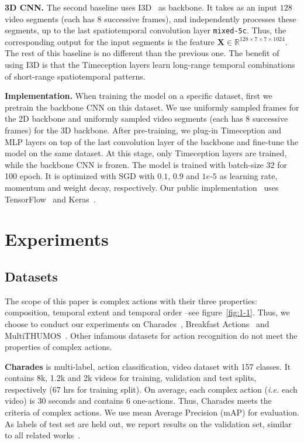 \documentclass[10pt,twocolumn,letterpaper]{article}
\newcommand{\partitle}[1]{\noindent\textbf{#1}}
\begin{document}
\partitle{3D CNN.}
The second baseline uses I3D~\cite{carreira2017quo} as backbone.
It takes as an input $128$ video segments (each has 8 successive frames), and independently processes these segments, up to the last spatiotemporal convolution layer \texttt{mixed-5c}.
Thus, the corresponding output for the input segments is the feature $\mathbf{X} \in \mathbb{R}^{128 \times 7 \times 7 \times 1024}$.
The rest of this baseline is no different than the previous one.
The benefit of using I3D is that the Timeception layers learn long-range temporal combinations of short-range spatiotemporal patterns.

\partitle{Implementation.}
When training the model on a specific dataset, first we pretrain the backbone CNN on this dataset.
We use uniformly sampled frames for the 2D backbone and uniformly sampled video segments (each has 8 successive frames) for the 3D backbone.
After pre-training, we plug-in Timeception and MLP layers on top of the last convolution layer of the backbone and fine-tune the model on the same dataset.
At this stage, only Timeception layers are trained, while the backbone CNN is frozen.
The model is trained with batch-size 32 for 100 epoch.
It is optimized with SGD with $0.1$, $0.9$ and $1e$-$5$ as learning rate, momentum and weight decay, respectively.
Our public implementation~\cite{timeceptioncode} uses TensorFlow~\cite{tensorflow2015-whitepaper} and Keras~\cite{chollet2015keras}.

\section{Experiments}\label{sec:experiments}
\subsection{Datasets}
The scope of this paper is complex actions with their three properties: composition, temporal extent and temporal order --see figure~\ref{fig:1-1}. Thus, we choose to conduct our experiments on Charades~\cite{sigurdsson2016hollywood}, Breakfast Actions~\cite{kuehne2014language} and MultiTHUMOS~\cite{yeung2018every}.
Other infamous datasets for action recognition do not meet the properties of complex actions.

\partitle{Charades}
is multi-label, action classification, video dataset with 157 classes.
It contains 8k, 1.2k and 2k videos for training, validation and test splits, respectively (67 hrs for training split).
On average, each complex action (\textit{i.e.} each video) is 30 seconds and contains 6 one-actions.
Thus, Charades meets the criteria of complex actions.
We use mean Average Precision (mAP) for evaluation.
As labels of test set are held out, we report results on the validation set, similar to all related works~\cite{sigurdsson2017asynchronous, girdhar2017actionvlad,sigurdsson2017asynchronous,wang2017non,wang2018videos}.
\end{document}
